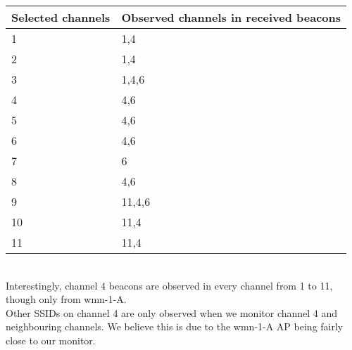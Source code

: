 \begin{tabular}{l | l}
Selected channels & Observed channels in received beacons \\ \hline
1 & 1,4\\ \hline
2 & 1,4\\ \hline
3 & 1,4,6\\ \hline
4 & 4,6\\ \hline
5 & 4,6\\ \hline
6 & 4,6\\ \hline
7 & 6\\ \hline
8 & 4,6\\ \hline
9 & 11,4,6\\ \hline
10 & 11,4\\ \hline
11 & 11,4\\
\end{tabular} \\ 
Interestingly, channel 4 beacons are observed in every channel from 1 to 11, though only from wmn-1-A.\\
Other SSIDs on channel 4 are only observed when we monitor channel 4 and neighbouring channels. We believe this is due to the wmn-1-A AP being fairly close to our monitor.
